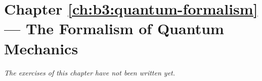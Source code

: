 \section*{Chapter \ref{ch:b3:quantum-formalism} --- The Formalism of Quantum Mechanics}


\emph{The exercises of this chapter have not been written yet.}
